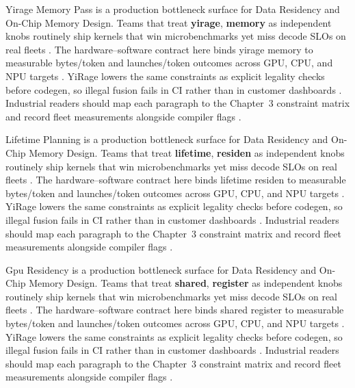Yirage Memory Pass is a production bottleneck surface for Data Residency and On-Chip Memory Design. Teams that treat \textbf{yirage}, \textbf{memory} as independent knobs routinely ship kernels that win microbenchmarks yet miss decode SLOs on real fleets \citep{taxbreak2026,semianalysis2024tma}. The hardware--software contract here binds yirage memory to measurable bytes/token and launches/token outcomes across GPU, CPU, and NPU targets \citep{memoryfloor2026,amd2024xdna}. YiRage lowers the same constraints as explicit legality checks before codegen, so illegal fusion fails in CI rather than in customer dashboards \citep{nvidia2022hopper,amd2024aie}. Industrial readers should map each paragraph to the Chapter~3 constraint matrix and record fleet measurements alongside compiler flags \citep{semianalysis2024tma,dlbook}.

Lifetime Planning is a production bottleneck surface for Data Residency and On-Chip Memory Design. Teams that treat \textbf{lifetime}, \textbf{residen} as independent knobs routinely ship kernels that win microbenchmarks yet miss decode SLOs on real fleets \citep{memoryfloor2026,amd2024xdna}. The hardware--software contract here binds lifetime residen to measurable bytes/token and launches/token outcomes across GPU, CPU, and NPU targets \citep{nvidia2022hopper,amd2024aie}. YiRage lowers the same constraints as explicit legality checks before codegen, so illegal fusion fails in CI rather than in customer dashboards \citep{semianalysis2024tma,dlbook}. Industrial readers should map each paragraph to the Chapter~3 constraint matrix and record fleet measurements alongside compiler flags \citep{amd2024xdna,dao2022flashattention}.

Gpu Residency is a production bottleneck surface for Data Residency and On-Chip Memory Design. Teams that treat \textbf{shared}, \textbf{register} as independent knobs routinely ship kernels that win microbenchmarks yet miss decode SLOs on real fleets \citep{nvidia2022hopper,amd2024aie}. The hardware--software contract here binds shared register to measurable bytes/token and launches/token outcomes across GPU, CPU, and NPU targets \citep{semianalysis2024tma,dlbook}. YiRage lowers the same constraints as explicit legality checks before codegen, so illegal fusion fails in CI rather than in customer dashboards \citep{amd2024xdna,dao2022flashattention}. Industrial readers should map each paragraph to the Chapter~3 constraint matrix and record fleet measurements alongside compiler flags \citep{amd2024aie,kwon2023vllm}.

